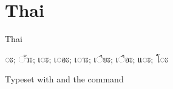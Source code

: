 \section{Thai}



\def\thaitext#1{{\thai#1}}

\begin{scriptexample}[]{Thai}
\bgroup
\centerline{\LARGE\thaitext{◌ะ; ◌ัวะ; เ◌ะ; เ◌อะ; เ◌าะ; เ◌ียะ; เ◌ือะ; แ◌ะ; โ◌ะ}}


\hfill Typeset with  and the command \cmd{\thai}
\egroup
\end{scriptexample}